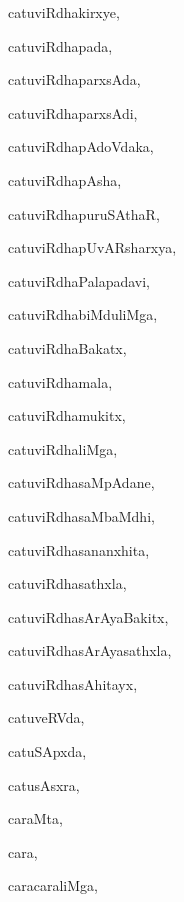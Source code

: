 \begin{multicols}{3}
{\noindent
{catuviRdhakirxye}, \pageref{catuviRdhakirxye}

\noindent
{catuviRdhapada}, \pageref{catuviRdhapada}

\noindent
{catuviRdhaparxsAda}, \pageref{catuviRdhaparxsAda}

\noindent
{catuviRdhaparxsAdi}, \pageref{catuviRdhaparxsAdi}

\noindent
{catuviRdhapAdoVdaka}, \pageref{catuviRdhapAdoVdaka}

\noindent
{catuviRdhapAsha}, \pageref{catuviRdhapAsha}

\noindent
{catuviRdhapuruSAthaR}, \pageref{catuviRdhapuruSAthaR}

\noindent
{catuviRdhapUvARsharxya}, \pageref{catuviRdhapUvARsharxya}

\noindent
{catuviRdhaPalapadavi}, \pageref{catuviRdhaPalapadavi}

\noindent
{catuviRdhabiMduliMga}, \pageref{catuviRdhabiMduliMga}

\noindent
{catuviRdhaBakatx}, \pageref{catuviRdhaBakatx}

\noindent
{catuviRdhamala}, \pageref{catuviRdhamala}

\noindent
{catuviRdhamukitx}, \pageref{catuviRdhamukitx}

\noindent
{catuviRdhaliMga}, \pageref{catuviRdhaliMga}

\noindent
{catuviRdhasaMpAdane}, \pageref{catuviRdhasaMpAdane}

\noindent
{catuviRdhasaMbaMdhi}, \pageref{catuviRdhasaMbaMdhi}

\noindent
{catuviRdhasananxhita}, \pageref{catuviRdhasananxhita}

\noindent
{catuviRdhasathxla}, \pageref{catuviRdhasathxla}

\noindent
{catuviRdhasArAyaBakitx}, \pageref{catuviRdhasArAyaBakitx}

\noindent
{catuviRdhasArAyasathxla}, \pageref{catuviRdhasArAyasathxla}

\noindent
{catuviRdhasAhitayx}, \pageref{catuviRdhasAhitayx}

\noindent
{catuveRVda}, \pageref{catuveRVda}

\noindent
{catuSApxda}, \pageref{catuSApxda}

\noindent
{catusAsxra}, \pageref{catusAsxra}

\noindent
{caraMta}, \pageref{caraMta}

\noindent
{cara}, \pageref{cara}

\noindent
{caracaraliMga}, \pageref{caracaraliMga}

}
\end{multicols}
